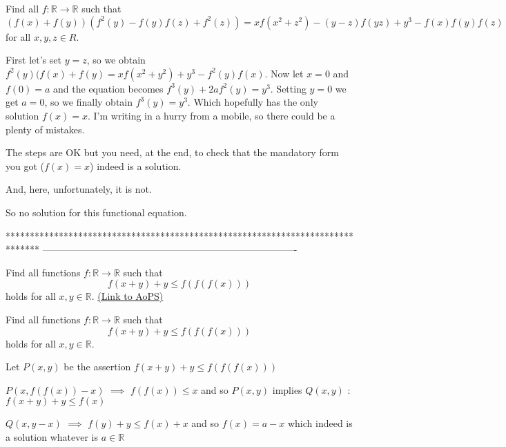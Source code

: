 \begin{solution}
	\begin{tcolorbox}Find all $f: \mathbb{R}\to\mathbb{R}$ such that 
$(f(x)+f(y))(f^2(y)-f(y)f(z)+f^2(z))=xf(x^2+z^2)-(y-z)f(yz)+y^3-f(x)f(y)f(z)$ for all   $x,y,z{\in}R$.\end{tcolorbox}
\begin{tcolorbox}First let's set $y=z$, so we obtain $f^2 (y)( f(x)+f(y)=xf(x^2+y^2)+y^3-f^2(y)f(x)$. Now let $x=0$ and $f(0)=a$ and the equation becomes $f^3(y)+2af^2(y)=y^3$. Setting $y=0$ we get $a=0$, so we finally obtain $f^3(y)=y^3$. Which hopefully has the only solution $f(x)=x$. I'm writing in a hurry from a mobile, so there could be a plenty of mistakes.\end{tcolorbox}
The steps are OK but you need, at the end, to check that the mandatory form you got ($f(x)=x$) indeed is a solution.

And, here, unfortunately, it is not.

So no solution for this functional equation.
\end{solution}
*******************************************************************************
-------------------------------------------------------------------------------

\begin{problem}
	Find all functions $f: \mathbb{R} \to \mathbb{R}$ such that
\[f(x + y) + y \le f(f(f(x)))\]
holds for all $x, y \in \mathbb{R}$.
	\flushright \href{https://artofproblemsolving.com/community/c6h532050}{(Link to AoPS)}
\end{problem}



\begin{solution}
	\begin{tcolorbox}Find all functions $f: \mathbb{R} \to \mathbb{R}$ such that
\[f(x + y) + y \le f(f(f(x)))\]
holds for all $x, y \in \mathbb{R}$.\end{tcolorbox}
Let $P(x,y)$ be the assertion $f(x+y)+y\le f(f(f(x)))$

$P(x,f(f(x))-x)$ $\implies$ $f(f(x))\le x$ and so $P(x,y)$ implies $Q(x,y)$ : $f(x+y)+y\le f(x)$

$Q(x,y-x)$ $\implies$ $f(y)+y\le f(x)+x$ and so $\boxed{f(x)=a-x}$ which indeed is a solution whatever is $a\in\mathbb R$
\end{solution}



